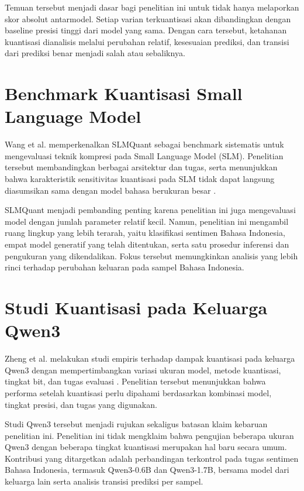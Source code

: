 Temuan tersebut menjadi dasar bagi penelitian ini untuk tidak hanya melaporkan skor absolut antarmodel. Setiap varian terkuantisasi akan dibandingkan dengan baseline presisi tinggi dari model yang sama. Dengan cara tersebut, ketahanan kuantisasi dianalisis melalui perubahan relatif, kesesuaian prediksi, dan transisi dari prediksi benar menjadi salah atau sebaliknya.

\section{Benchmark Kuantisasi Small Language Model}

Wang et al. memperkenalkan SLMQuant sebagai benchmark sistematis untuk mengevaluasi teknik kompresi pada Small Language Model (SLM). Penelitian tersebut membandingkan berbagai arsitektur dan tugas, serta menunjukkan bahwa karakteristik sensitivitas kuantisasi pada SLM tidak dapat langsung diasumsikan sama dengan model bahasa berukuran besar \citep{wang2025slmquant}.

SLMQuant menjadi pembanding penting karena penelitian ini juga mengevaluasi model dengan jumlah parameter relatif kecil. Namun, penelitian ini mengambil ruang lingkup yang lebih terarah, yaitu klasifikasi sentimen Bahasa Indonesia, empat model generatif yang telah ditentukan, serta satu prosedur inferensi dan pengukuran yang dikendalikan. Fokus tersebut memungkinkan analisis yang lebih rinci terhadap perubahan keluaran pada sampel Bahasa Indonesia.

\section{Studi Kuantisasi pada Keluarga Qwen3}

Zheng et al. melakukan studi empiris terhadap dampak kuantisasi pada keluarga Qwen3 dengan mempertimbangkan variasi ukuran model, metode kuantisasi, tingkat bit, dan tugas evaluasi \citep{zheng2025qwen3}. Penelitian tersebut menunjukkan bahwa performa setelah kuantisasi perlu dipahami berdasarkan kombinasi model, tingkat presisi, dan tugas yang digunakan.

Studi Qwen3 tersebut menjadi rujukan sekaligus batasan klaim kebaruan penelitian ini. Penelitian ini tidak mengklaim bahwa pengujian beberapa ukuran Qwen3 dengan beberapa tingkat kuantisasi merupakan hal baru secara umum. Kontribusi yang ditargetkan adalah perbandingan terkontrol pada tugas sentimen Bahasa Indonesia, termasuk Qwen3-0.6B dan Qwen3-1.7B, bersama model dari keluarga lain serta analisis transisi prediksi per sampel.

